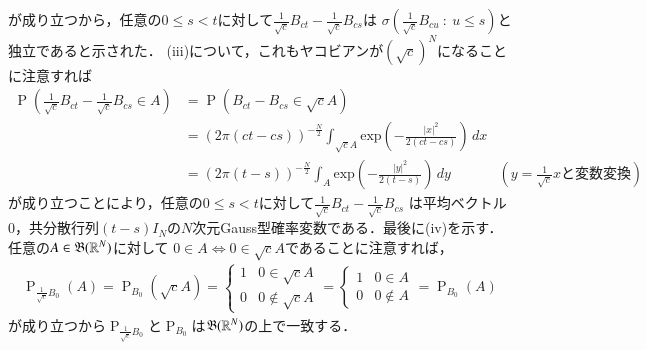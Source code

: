 \begin{prf}
\begin{description}
		が成り立つから，任意の$0 \leq s < t$に対して$\tfrac{1}{\sqrt{c}}B_{ct} - \tfrac{1}{\sqrt{c}}B_{cs}$は
		$\sigma\left(\tfrac{1}{\sqrt{c}}B_{cu}\ :\ u \leq s\right)$と独立であると示された．
		(iii)について，これもヤコビアンが$\left(\sqrt{c}\right)^{N}$になることに注意すれば
		\begin{align}
			\operatorname{P}\left( \tfrac{1}{\sqrt{c}}B_{ct} - \tfrac{1}{\sqrt{c}}B_{cs} \in A \right)
			&= \operatorname{P}\left( B_{ct} - B_{cs} \in \sqrt{c}A \right) \\
			&= (2\pi(ct-cs))^{-\frac{N}{2}} \int_{\sqrt{c}A} \mathrm{exp}\left( -\frac{|x|^2}{2(ct-cs)} \right)\, dx \\
			&= (2\pi(t-s))^{-\frac{N}{2}} \int_{A} \mathrm{exp}\left( -\frac{|y|^2}{2(t-s)} \right)\, dy 
				& \left( y = \tfrac{1}{\sqrt{c}}x\mbox{と変数変換}\right)
		\end{align}
		が成り立つことにより，任意の$0 \leq s < t$に対して$\tfrac{1}{\sqrt{c}}B_{ct} - \tfrac{1}{\sqrt{c}}B_{cs}$
		は平均ベクトル0，共分散行列$(t-s)I_N$の$N$次元Gauss型確率変数である．最後に(iv)を示す．
		任意の$A \in \mathfrak{B}(\mathbb{R}^N)$に対して
		$0 \in A \Leftrightarrow 0 \in \sqrt{c}A$であることに注意すれば，
		\begin{align}
			\operatorname{P}_{\tfrac{1}{\sqrt{c}}B_0}(A) = \operatorname{P}_{B_0}(\sqrt{c}A) 
			= \begin{cases}
				1 & 0 \in \sqrt{c}A \\
				0 & 0 \notin \sqrt{c}A
			\end{cases}
			= \begin{cases}
				1 & 0 \in A \\
				0 & 0 \notin A
			\end{cases}
			= \operatorname{P}_{B_0}(A)
		\end{align}
		が成り立つから$\operatorname{P}_{\tfrac{1}{\sqrt{c}}B_0}$と$\operatorname{P}_{B_0}$は$\mathfrak{B}(\mathbb{R}^N)$の上で一致する．
\end{description}
\end{prf}
